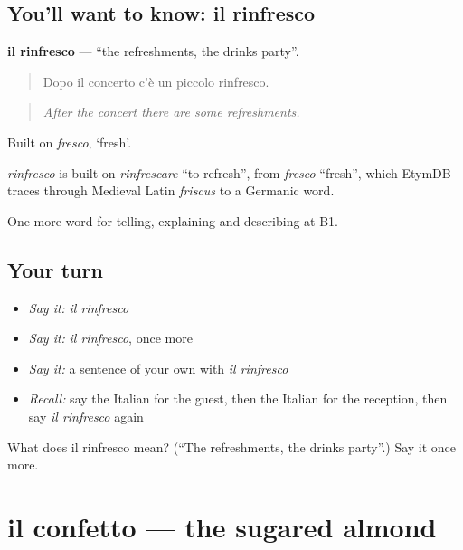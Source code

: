 \subsection*{You'll want to know: il rinfresco}
\textbf{il rinfresco} — \textquotedblleft{}the refreshments, the drinks party\textquotedblright{}.

\begin{quote}
Dopo il concerto c'è un piccolo rinfresco.
\end{quote}

\begin{quote}
\emph{After the concert there are some refreshments.}
\end{quote}

Built on \emph{fresco}, ‘fresh’.

\begin{cousinweb}
\emph{rinfresco} is built on \emph{rinfrescare} \textquotedblleft{}to refresh\textquotedblright{}, from \emph{fresco} \textquotedblleft{}fresh\textquotedblright{}, which EtymDB traces through Medieval Latin \emph{friscus} to a Germanic word.
\end{cousinweb}

\begin{grammarlens}[title={What you've built}]
One more word for telling, explaining and describing at B1.
\end{grammarlens}

\subsection*{Your turn}
\begin{itemize}
\raggedright
  \item \emph{Say it:} \emph{il rinfresco}
  \item \emph{Say it:} \emph{il rinfresco}, once more
  \item \emph{Say it:} a sentence of your own with \emph{il rinfresco}
  \item \emph{Recall:} say the Italian for the guest, then the Italian for the reception, then say \emph{il rinfresco} again
\end{itemize}

\begin{tcolorbox}[breakable,colback=teal!4,colframe=teal!35!black,title={Before you move on}]
What does il rinfresco mean? (\textquotedblleft{}The refreshments, the drinks party\textquotedblright{}.) Say it once more.
\end{tcolorbox}
\section[il confetto]{il confetto — the sugared almond}

